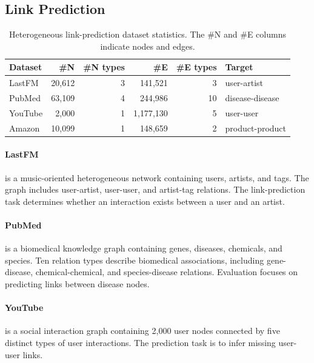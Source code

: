 \documentclass[sigconf,anonymous,review]{acmart}
\begin{document}
\subsection{Link Prediction}

\begin{table}[H]
  \centering
  \caption{Heterogeneous link-prediction dataset statistics. The \#N and \#E columns
  indicate nodes and edges.}
  \label{tab:link-datasets}
  \scriptsize
  \resizebox{\columnwidth}{!}
  {%
  \begin{tabular}{lrrrrl}
    \toprule
    \textbf{Dataset} & \textbf{\#N} & \textbf{\#N types} & \textbf{\#E} &
    \textbf{\#E types} & \textbf{Target} \\
    \midrule
    LastFM & 20{,}612 & 3 & 141{,}521 & 3 & user-artist \\
    PubMed & 63{,}109 & 4 & 244{,}986 & 10 & disease-disease \\
    YouTube & 2{,}000 & 1 & 1{,}177{,}130 & 5 & user-user \\
    Amazon & 10{,}099 & 1 & 148{,}659 & 2 & product-product \\
    \bottomrule
  \end{tabular}%
  }
\end{table}

\paragraph{LastFM}
is a music-oriented heterogeneous network containing users, artists,
and tags. The graph includes user-artist, user-user, and artist-tag
relations. The link-prediction task determines whether an interaction exists
between a user and an artist.

\paragraph{PubMed}
is a biomedical knowledge graph containing genes, diseases, chemicals,
and species. Ten relation types describe biomedical associations, including
gene-disease, chemical-chemical, and species-disease relations. Evaluation
focuses on predicting links between disease nodes.

\paragraph{YouTube}
is a social interaction graph containing 2,000 user nodes connected by
five distinct types of user interactions. The prediction task is to infer
missing user-user links.
\end{document}
